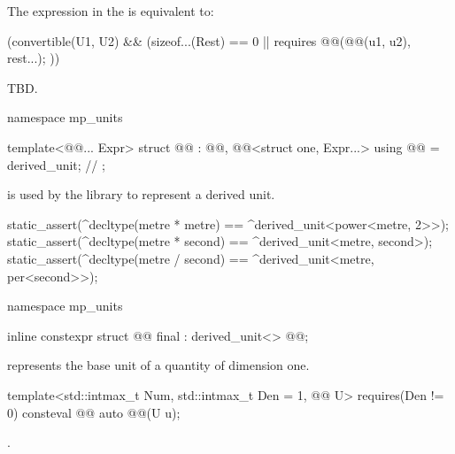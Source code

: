\begin{itemdescr}
\pnum
The expression in the  is equivalent to:
\begin{codeblock}
(convertible(U1{}, U2{}) && (sizeof...(Rest) == 0 || requires {
   @@(@@(u1, u2), rest...);
 }))
\end{codeblock}

\pnum
\returns
TBD.
\end{itemdescr}

\begin{codeblock}
namespace mp_units {

template<@@... Expr>
struct @@ : @@, @@<struct one, Expr...> {
  using @@ = derived_unit;  // \expos
};

}
\end{codeblock}

\pnum
{} is used by the library
to represent a derived unit.
\begin{example}
\begin{codeblock}
static_assert(^decltype(metre * metre) == ^derived_unit<power<metre, 2>>);
static_assert(^decltype(metre * second) == ^derived_unit<metre, second>);
static_assert(^decltype(metre / second) == ^derived_unit<metre, per<second>>);
\end{codeblock}
\end{example}

\begin{codeblock}
namespace mp_units {

inline constexpr struct @@ final : derived_unit<> {} @@;

}
\end{codeblock}

\pnum
{} represents the base unit of a quantity of dimension one.

\begin{itemdecl}
template<std::intmax_t Num, std::intmax_t Den = 1, @@ U>
  requires(Den != 0)
consteval @@ auto @@(U u);
\end{itemdecl}

\begin{itemdescr}
\pnum
\returns
{}.
\end{itemdescr}

